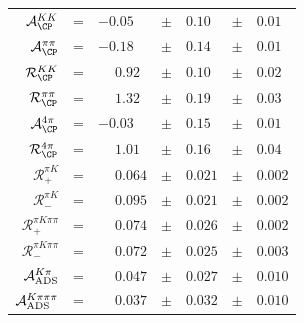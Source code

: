 \begin{center}
\begin{tabular}{rclclcl}
$\mathcal{A}_{\CP}^{KK}$ &= & $-0.05$ & $\pm$ & $0.10$ & $\pm$ & $0.01$ \\
$\mathcal{A}_{\CP}^{\pi\pi}$ &= & $-0.18$ & $\pm$ & $0.14$ & $\pm$ & $0.01$ \\
$\mathcal{R}_{\CP}^{KK}$ &= & $\phantom{+}0.92$ & $\pm$ & $0.10$ & $\pm$ & $0.02$ \\
$\mathcal{R}_{\CP}^{\pi\pi}$ &= & $\phantom{+}1.32$ & $\pm$ & $0.19$ & $\pm$ & $0.03$ \\
$\mathcal{A}_{\CP}^{4\pi}$ &= & $-0.03$ & $\pm$ & $0.15$ & $\pm$ & $0.01$ \\
$\mathcal{R}_{\CP}^{4\pi}$ &= & $\phantom{+}1.01$ & $\pm$ & $0.16$ & $\pm$ & $0.04$ \\
$\mathcal{R}_+^{\pi K}$ &= & $\phantom{+}0.064$ & $\pm$ & $0.021$ & $\pm$ & $0.002$ \\
$\mathcal{R}_-^{\pi K}$ &= & $\phantom{+}0.095$ & $\pm$ & $0.021$ & $\pm$ & $0.002$ \\
$\mathcal{R}_+^{\pi K\pi\pi}$ &= & $\phantom{+}0.074$ & $\pm$ & $0.026$ & $\pm$ & $0.002$ \\
$\mathcal{R}_-^{\pi K\pi\pi}$ &= & $\phantom{+}0.072$ & $\pm$ & $0.025$ & $\pm$ & $0.003$ \\
$\mathcal{A}_{\rm ADS}^{K\pi}$ &= & $\phantom{+}0.047$ & $\pm$ & $0.027$ & $\pm$ & $0.010$ \\
$\mathcal{A}_{\rm ADS}^{K\pi\pi\pi}$ &= & $\phantom{+}0.037$ & $\pm$ & $0.032$ & $\pm$ & $0.010$ \\
\end{tabular}
\end{center}

